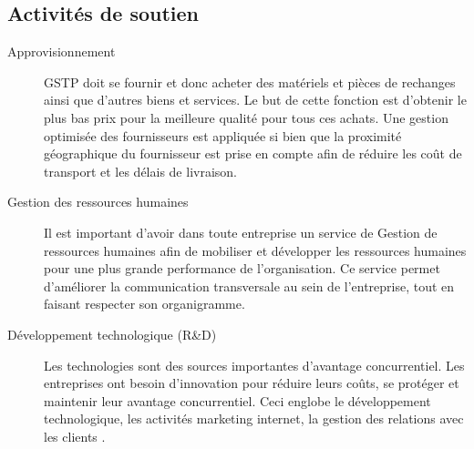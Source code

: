     \subsection{Activités de soutien}
        \begin{description}
            \item [Approvisionnement]
            GSTP doit se fournir et donc acheter des matériels et pièces de rechanges ainsi que d’autres biens et services. Le but de cette fonction est d'obtenir le plus bas prix pour la meilleure qualité pour tous ces achats. Une gestion optimisée des fournisseurs est appliquée si bien que la proximité géographique du fournisseur est prise en compte afin de réduire les coût de transport et les délais de livraison.
            \item [Gestion des ressources humaines]
            Il est important d’avoir dans toute entreprise un service de Gestion de ressources humaines afin de mobiliser et développer les ressources humaines pour une plus grande performance de l'organisation. Ce service permet d’améliorer la communication transversale au sein de l’entreprise, tout en faisant respecter son organigramme.

            \item [Développement technologique (R\&D)]
            Les technologies sont des sources importantes d'avantage concurrentiel. Les entreprises ont besoin d'innovation pour réduire leurs coûts, se protéger et maintenir leur avantage concurrentiel. Ceci englobe le développement technologique, les activités marketing internet, la gestion des relations avec les clients .

    \end{description}
